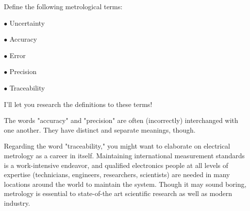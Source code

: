 

Define the following metrological terms:

\medskip
\item{$\bullet$} Uncertainty
\item{$\bullet$} Accuracy
\item{$\bullet$} Error
\item{$\bullet$} Precision
\item{$\bullet$} Traceability
\medskip







I'll let you research the definitions to these terms!







The words "accuracy" and "precision" are often (incorrectly) interchanged with one another.  They have distinct and separate meanings, though.

Regarding the word "traceability," you might want to elaborate on electrical metrology as a career in itself.  Maintaining international measurement standards is a work-intensive endeavor, and qualified electronics people at all levels of expertise (technicians, engineers, researchers, scientists) are needed in many locations around the world to maintain the system.  Though it may sound boring, metrology is essential to state-of-the art scientific research as well as modern industry.



